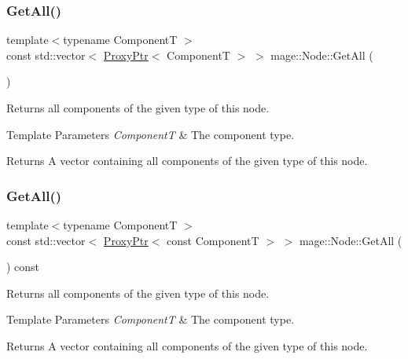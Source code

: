 \subsubsection{\texorpdfstring{Get\+All()}{GetAll()}\hspace{0.1cm}{\footnotesize\ttfamily [1/2]}}
{\footnotesize\ttfamily template$<$typename ComponentT $>$ \\
const std\+::vector$<$ \mbox{\hyperlink{classmage_1_1_proxy_ptr}{Proxy\+Ptr}}$<$ ComponentT $>$ $>$ mage\+::\+Node\+::\+Get\+All (\begin{DoxyParamCaption}{ }\end{DoxyParamCaption})}

Returns all components of the given type of this node.


\begin{DoxyTemplParams}{Template Parameters}
{\em ComponentT} & The component type. \\
\hline
\end{DoxyTemplParams}
\begin{DoxyReturn}{Returns}
A vector containing all components of the given type of this node. 
\end{DoxyReturn}
\mbox{\label{classmage_1_1_node_a920ff966a7f970189fcbae86025ab3aa}} 
\subsubsection{\texorpdfstring{Get\+All()}{GetAll()}\hspace{0.1cm}{\footnotesize\ttfamily [2/2]}}
{\footnotesize\ttfamily template$<$typename ComponentT $>$ \\
const std\+::vector$<$ \mbox{\hyperlink{classmage_1_1_proxy_ptr}{Proxy\+Ptr}}$<$ const ComponentT $>$ $>$ mage\+::\+Node\+::\+Get\+All (\begin{DoxyParamCaption}{ }\end{DoxyParamCaption}) const}

Returns all components of the given type of this node.


\begin{DoxyTemplParams}{Template Parameters}
{\em ComponentT} & The component type. \\
\hline
\end{DoxyTemplParams}
\begin{DoxyReturn}{Returns}
A vector containing all components of the given type of this node. 
\end{DoxyReturn}
\mbox{\label{classmage_1_1_node_a69d5c613982a4dfd5175538aff6a07a5}} 
